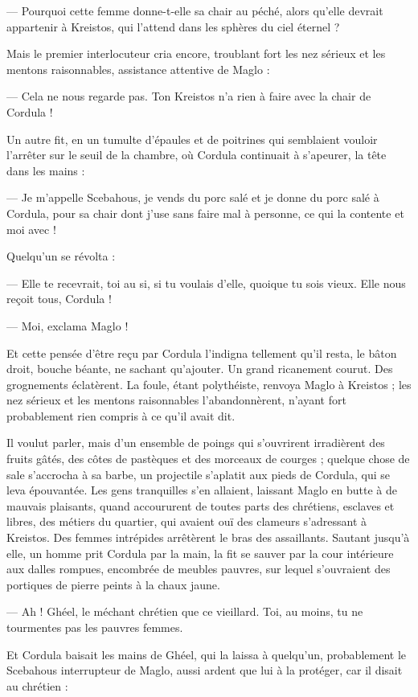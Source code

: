 \documentclass[a4paper, 11pt, oneside, polutonikogreek, french]{article}
\begin{document}
--- Pourquoi cette femme donne-t-elle sa chair au péché, alors qu'elle devrait appartenir à Kreistos, qui l'attend dans les sphères du ciel éternel ?

Mais le premier interlocuteur cria encore, troublant fort les nez sérieux et les mentons raisonnables, assistance attentive de Maglo :

--- Cela ne nous regarde pas. Ton Kreistos n'a rien à faire avec la chair de Cordula !

Un autre fit, en un tumulte d'épaules et de poitrines qui semblaient vouloir l'arrêter sur le seuil de la chambre, où Cordula continuait à s'apeurer, la tête dans les mains :

--- Je m'appelle Scebahous, je vends du porc salé et je donne du porc salé à Cordula, pour sa chair dont j'use sans faire mal à personne, ce qui la contente et moi avec !

Quelqu'un se révolta :

--- Elle te recevrait, toi au si, si tu voulais d'elle, quoique tu sois vieux. Elle nous reçoit tous, Cordula !

--- Moi, exclama Maglo !

Et cette pensée d'être reçu par Cordula l'indigna tellement qu'il resta, le bâton droit, bouche béante, ne sachant qu'ajouter. Un grand ricanement courut. Des grognements éclatèrent. La foule, étant polythéiste, renvoya Maglo à Kreistos ; les nez sérieux et les mentons raisonnables l'abandonnèrent, n'ayant fort probablement rien compris à ce qu'il avait dit.

Il voulut parler, mais d'un ensemble de poings qui s'ouvrirent irradièrent des fruits gâtés, des côtes de pastèques et des morceaux de courges ; quelque chose de sale s'accrocha à sa barbe, un projectile s'aplatit aux pieds de Cordula, qui se leva épouvantée. Les gens tranquilles s'en allaient, laissant Maglo en butte à de mauvais plaisants, quand accoururent de toutes parts des chrétiens, esclaves et libres, des métiers du quartier, qui avaient ouï des clameurs s'adressant à Kreistos. Des femmes intrépides arrêtèrent le bras des assaillants. Sautant jusqu'à elle, un homme prit Cordula par la main, la fit se sauver par la cour intérieure aux dalles rompues, encombrée de meubles pauvres, sur lequel s'ouvraient des portiques de pierre peints à la chaux jaune.

--- Ah ! Ghéel, le méchant chrétien que ce vieillard. Toi, au moins, tu ne tourmentes pas les pauvres femmes.

Et Cordula baisait les mains de Ghéel, qui la laissa à quelqu'un, probablement le Scebahous interrupteur de Maglo, aussi ardent que lui à la protéger, car il disait au chrétien :
\end{document}
